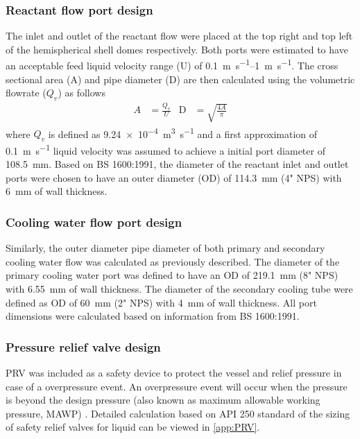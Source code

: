 \subsubsection{Reactant flow port design}
The inlet and outlet of the reactant flow were placed at the top right and top left of the hemispherical shell domes respectively. Both ports were estimated to have an acceptable feed liquid velocity range (U) of \SIrange{0.1}{1}{\m\per\s}. The cross sectional area (A) and pipe diameter (D) are then calculated using the volumetric flowrate ($Q_v$) as follows
\begin{align}
    A &= \frac{Q_v}{U} &
    \mathrm{D} &= \sqrt{\frac{4A}{\pi}}
\end{align}
where $Q_v$ is defined as \SI{9.24e-4}{\cubic\m\per\s} and a first approximation of \SI{0.1}{\m\per\s} liquid velocity was assumed to achieve a initial port diameter of \SI{108.5}{\milli \metre}. Based on BS 1600:1991, the diameter of the reactant inlet and outlet ports were chosen to have an outer diameter (OD) of \SI{114.3}{\milli \metre} (4" NPS) with \SI{6}{\milli \metre} of wall thickness. 

\subsubsection{Cooling water flow port design}
Similarly, the outer diameter pipe diameter of both primary and secondary cooling water flow was calculated as previously described. The diameter of the primary cooling water port was defined to have an OD of \SI{219.1}{\milli \metre} (8" NPS) with \SI{6.55}{\milli \metre} of wall thickness. The diameter of the secondary cooling tube were defined as OD of \SI{60}{\milli \metre} (2" NPS) with \SI{4}{\milli \metre} of wall thickness. All port dimensions were calculated based on information from BS 1600:1991. 


\subsubsection{Pressure relief valve design}
PRV was included as a safety device to protect the vessel and relief pressure in case of a overpressure event. An overpressure event will occur when the pressure is beyond the design pressure (also known as maximum allowable working pressure, MAWP) \cite{marsha_lecture_nodate}. Detailed calculation based on API 250 standard \cite{api_standard_520_sizing_2013} of the sizing of safety relief valves for liquid can be viewed in \ref{app:PRV}.

